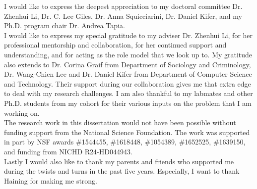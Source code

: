 

I would like to express the deepest appreciation to my doctoral committee Dr. Zhenhui Li, Dr. C. Lee Giles, Dr. Anna Squicciarini, Dr. Daniel Kifer, and my Ph.D. program chair Dr. Andrea Tapia. \\

I would like to express my special gratitude to my adviser Dr. Zhenhui Li, for her professional mentorship and collaboration, for her continued support and understanding, and for acting as the role model that we look up to. My gratitude also extends to Dr. Corina Graif from Department of Sociology and Criminology, Dr. Wang-Chien Lee and Dr. Daniel Kifer from Department of Computer Science and Technology. Their support during our collaboration gives me that extra edge to deal with my research challenges. I am also thankful to my labmates and other Ph.D. students from my cohort for their various inputs on the problem that I am working on. \\

The research work in this dissertation would not have been possible without funding support from the National Science Foundation. The work was supported in part by NSF awards \#1544455, \#1618448, \#1054389, \#1652525, \#1639150, and funding from NICHD R24-HD044943. \\

Lastly I would also like to thank my parents and friends who supported me during the twists and turns in the past five years. Especially, I want to thank Haining for making me strong.
